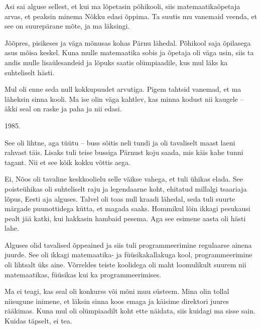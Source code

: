 
Asi sai alguse sellest, et kui ma lõpetasin põhikooli, siis 
matemaatikaõpetaja arvas, et peaksin minema Nõkku edasi õppima. Ta suutis mu vanemaid veenda, et see on suurepärane 
mõte, ja ma läksingi.


Jõõpres, pisikeses ja väga mõnusas kohas Pärnu 
lähedal. Põhikool saja õpilasega asus mõisa keskel. Kuna mulle matemaatika 
sobis ja õpetaja oli väga usin, siis ta andis mulle lisaülesandeid 
ja lõpuks saatis olümpiaadile, kus mul läks ka suhteliselt hästi.



Mul oli enne seda null kokkupuudet arvutiga. Pigem tahtsid vanemad, et ma läheksin sinna kooli. Ma ise olin väga kahtlev, kas minna kodust 
nii kaugele -- äkki seal on raske ja paha ja nii edasi. 


1985. 


See oli lihtne, aga tüütu -- buss sõitis neli tundi 
ja oli tavaliselt maast laeni rahvast täis. Lisaks tuli teise bussiga Pärnust koju saada, mis
käis kahe tunni tagant. Nii et see kõik kokku võttis aega.  


Ei, Nõos oli tavaline keskkoolielu selle väikse vahega, et tuli ühikas 
elada. See poisteühikas oli 
suhteliselt raju ja legendaarne koht, ehitatud millalgi tsaariaja lõpus, Eesti 
aja alguses. Talvel oli toas null kraadi lähedal, seda tuli suurte 
märgade puunottidega kütta, et magada saaks. Hommikul lõin ikkagi pesukausi pealt jää katki, 
kui hakkasin hambaid pesema. Aga see esimene aasta oli hästi lahe. 

Alguses olid tavalised õppeained ja siis tuli programmeerimine 
regulaarse ainena juurde. See oli ikkagi matemaatika- ja 
füüsikakallakuga kool, programmeerimine oli lihtsalt üks
aine. Võrreldes teiste koolidega oli maht loomulikult suurem nii 
matemaatikas, füüsikas kui ka programmeerimises.


Ma ei teagi, kas seal oli konkurss või mõni muu süsteem. Mina olin tollal niisugune inimene, et läksin sinna koos emaga ja käisime direktori juures rääkimas. Kuna mul oli 
olümpiaadilt koht ette näidata, siis kuidagi ma 
sisse sain. Kuidas täpselt, ei tea. 

